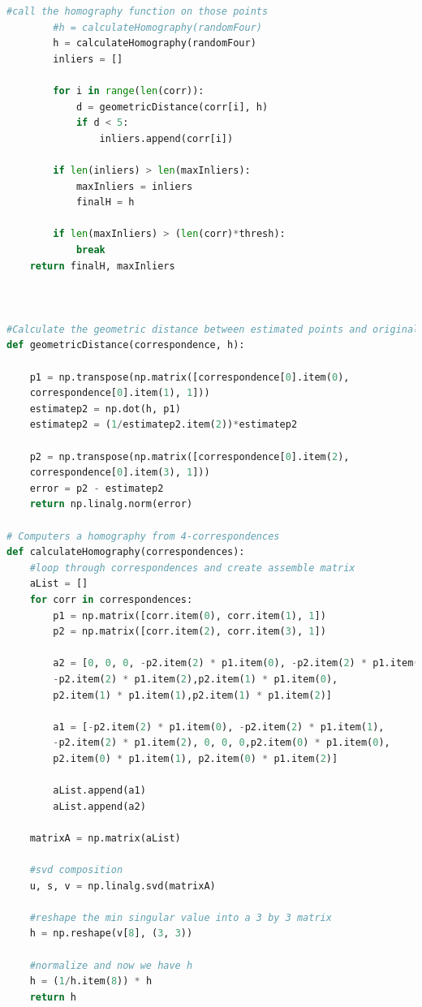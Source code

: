 \documentclass{exam}
\begin{document}
\begin{questions}
\begin{lstlisting}[language=python, frame=single]
        #call the homography function on those points
        #h = calculateHomography(randomFour)
        h = calculateHomography(randomFour)
        inliers = []

        for i in range(len(corr)):
            d = geometricDistance(corr[i], h)
            if d < 5:
                inliers.append(corr[i])

        if len(inliers) > len(maxInliers):
            maxInliers = inliers
            finalH = h

        if len(maxInliers) > (len(corr)*thresh):
            break
    return finalH, maxInliers



#Calculate the geometric distance between estimated points and original points
def geometricDistance(correspondence, h):

    p1 = np.transpose(np.matrix([correspondence[0].item(0), 
    correspondence[0].item(1), 1]))
    estimatep2 = np.dot(h, p1)
    estimatep2 = (1/estimatep2.item(2))*estimatep2

    p2 = np.transpose(np.matrix([correspondence[0].item(2), 
    correspondence[0].item(3), 1]))
    error = p2 - estimatep2
    return np.linalg.norm(error)

# Computers a homography from 4-correspondences
def calculateHomography(correspondences):
    #loop through correspondences and create assemble matrix
    aList = []
    for corr in correspondences:
        p1 = np.matrix([corr.item(0), corr.item(1), 1])
        p2 = np.matrix([corr.item(2), corr.item(3), 1])

        a2 = [0, 0, 0, -p2.item(2) * p1.item(0), -p2.item(2) * p1.item(1), 
        -p2.item(2) * p1.item(2),p2.item(1) * p1.item(0), 
        p2.item(1) * p1.item(1),p2.item(1) * p1.item(2)]
        
        a1 = [-p2.item(2) * p1.item(0), -p2.item(2) * p1.item(1), 
        -p2.item(2) * p1.item(2), 0, 0, 0,p2.item(0) * p1.item(0), 
        p2.item(0) * p1.item(1), p2.item(0) * p1.item(2)]
        
        aList.append(a1)
        aList.append(a2)

    matrixA = np.matrix(aList)

    #svd composition
    u, s, v = np.linalg.svd(matrixA)

    #reshape the min singular value into a 3 by 3 matrix
    h = np.reshape(v[8], (3, 3))

    #normalize and now we have h
    h = (1/h.item(8)) * h
    return h



\end{lstlisting}
\end{questions}
\end{document}
